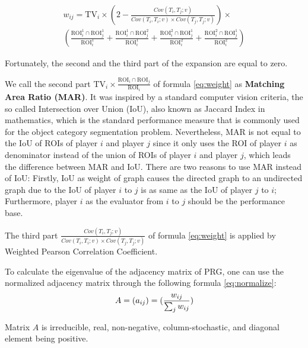 \begin{multline}
\label{eq:expand}
w_{ij} = \text{TV}_i \times \left(2-\frac{Cov(T_i, T_j; v)}{Cov(T_i, T_i; v)\times Cov(T_j, T_j; v)}\right) \times \\
  \left( \frac{\text{ROI}_i^1\cap\text{ROI}_j^1}{\text{ROI}_i^1}           
  + \frac{\text{ROI}_i^1\cap\text{ROI}_j^2}{\text{ROI}_i^1}           
  + \frac{\text{ROI}_i^2\cap\text{ROI}_j^1}{\text{ROI}_i^2}           
  + \frac{\text{ROI}_i^2\cap\text{ROI}_j^1}{\text{ROI}_i^2} \right)
\end{multline}

Fortunately, the second and the third part of the expansion are equal to zero.

We call the second part $\text{TV}_i \times \frac{\text{ROI}_i\cap\text{ROI}_j}{\text{ROI}_i}$ 
of formula \ref{eq:weight} as \textbf{Matching Area Ratio (MAR)}. 
It was inspired by a standard computer vision criteria,
the so called Intersection over Union (IoU), also known as Jaccard Index in mathematics\cite{real1996probabilistic},
which is the standard performance measure that is commonly used for the object category segmentation problem.
Nevertheless, MAR is not equal to the IoU of ROIs of player $i$  and 
player $j$ since it only uses the ROI of player $i$ as denominator instead of 
the union of ROIs of player $i$ and player $j$, which leads the difference between MAR and IoU. 
There are two reasons to use MAR instead of IoU:
Firstly, IoU as weight of graph causes the directed graph to an undirected graph due to 
the IoU of player $i$ to $j$ is as same as the IoU of player $j$ to $i$; Furthermore, 
player $i$ as the evaluator from $i$ to $j$ should be the performance base.

The third part $\frac{Cov(T_i, T_j; v)}{Cov(T_i, T_i; v)\times Cov(T_j, T_j; v)}$
of formula \ref{eq:weight} is applied by Weighted Pearson Correlation Coefficient.

To calculate the eigenvalue of the adjacency matrix of PRG, one can use the normalized adjacency matrix 
through the following formula \ref{eq:normalize}:
\begin{equation}
\label{eq:normalize}
A = (a_{ij}) = (\frac{w_{ij}}{\sum_{j}{w_{ij}}})\\
\end{equation}

\begin{theorem}
Matrix $A$ is irreducible, real, non-negative, column-stochastic, and diagonal element being positive.
\end{theorem}

